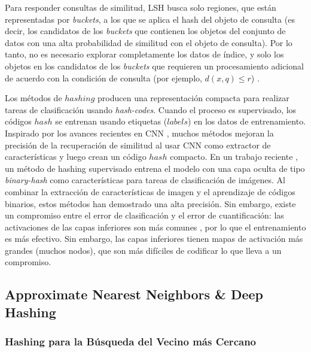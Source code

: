 Para responder consultas de similitud, \ac{LSH} busca solo regiones, que están representadas por \textit{buckets}, a los que se aplica el hash del objeto de consulta (es decir, los candidatos de los \textit{buckets}  que contienen los objetos del conjunto de datos con una alta probabilidad de similitud con el objeto de consulta). Por lo tanto, no es necesario explorar completamente los datos de índice, y solo los objetos en los candidatos de los \textit{buckets}  que requieren un procesamiento adicional de acuerdo con la condición de consulta (por ejemplo, $ d(x,q) \leq r $) \cite{DBLP:journals/jidm/OcsaS10}.

Los métodos de $hashing$ producen una representación compacta  para realizar   tareas de clasificación usando \textit{hash-codes}. Cuando el proceso es supervisado, los códigos $hash$ se entrenan usando etiquetas ($labels$) en los datos de entrenamiento. Inspirado por los avances recientes en \acf{CNN} \cite{ImageNet}, muchos métodos mejoran la precisión de la recuperación de similitud al usar CNN como extractor de características y luego crean un código $hash$ compacto. En un trabajo reciente \cite{kLin:DH}, un método de hashing supervisado entrena el modelo con una capa oculta de tipo \textit{binary-hash} como características para tareas de clasificación de imágenes. Al combinar la extracción de características de imagen y el aprendizaje de códigos binarios, estos métodos han demostrado una alta precisión. Sin embargo, existe un compromiso entre el error de clasificación y el error de cuantificación: las activaciones de las capas inferiores son más comunes \cite{DBLP:journals/corr/YosinskiCBL14}, por lo que el entrenamiento es más efectivo. Sin embargo, las capas inferiores tienen mapas de activación más grandes (muchos nodos), que son más difíciles de codificar lo que lleva a un compromiso.


\subsection{Approximate Nearest Neighbors \& Deep Hashing}

\subsubsection{Hashing para la Búsqueda del Vecino más Cercano}

